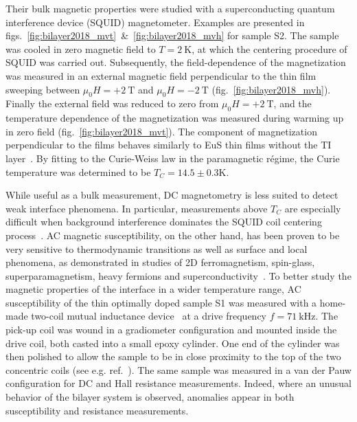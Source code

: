 %
%
%
Their bulk magnetic properties were studied with a superconducting quantum interference device (SQUID) magnetometer. Examples are presented in figs.~\ref{fig:bilayer2018_mvt}~\&~\ref{fig:bilayer2018_mvh} for sample S2. The sample was cooled in zero magnetic field to $T=2~\mathrm{K}$, at which the centering procedure of SQUID was carried out. Subsequently, the field-dependence of the magnetization was measured in an external magnetic field perpendicular to the thin film sweeping between $\mu_0H = +2~\mathrm{T}$ and $\mu_0H = -2~\mathrm{T}$ (fig.~\ref{fig:bilayer2018_mvh}). Finally the external field was reduced to zero from $\mu_0H = +2~\mathrm{T}$, and the temperature dependence of the magnetization was measured during warming up in zero field (fig.~\ref{fig:bilayer2018_mvt}). The component of magnetization perpendicular to the films behaves similarly to EuS thin films without the TI layer~\cite{EuS_PLD}. By fitting to the Curie-Weiss law in the paramagnetic r\'egime, the Curie temperature was determined to be $T_C = 14.5\pm0.3\mathrm{K}$.

While useful as a bulk measurement, DC magnetometry is less suited to detect weak interface phenomena. In particular, measurements above $T_C$ are especially difficult when background interference dominates the SQUID coil centering process~\cite{squid_center_error}. AC magnetic susceptibility, on the other hand, has been proven to be very sensitive to thermodynamic transitions as well as surface and local phenomena, as demonstrated in studies of 2D ferromagnetism, spin-glass, superparamagnetism, heavy fermions and superconductivity~\cite{ac_nitroxide, ac_spin_glass, ac_superpara, Ando1994, Gegenwart2005, Schemm2014}. To better study the magnetic properties of the interface in a wider temperature range, AC susceptibility of the thin optimally doped sample S1 was measured with a home-made two-coil mutual inductance device~\cite{Jeanneret1989,Yazdani1993} at a drive frequency $f=71~\mathrm{kHz}$. The pick-up coil was wound in a gradiometer configuration and mounted inside the drive coil, both casted into a small epoxy cylinder. One end of the cylinder was then polished to allow the sample to be in close proximity to the top of the two concentric coils (see e.g. ref.~\cite{YazdaniThesis}). The same sample was measured in a van der Pauw configuration for DC and Hall resistance measurements. Indeed, where an unusual behavior of the bilayer system is observed, anomalies appear in both susceptibility and resistance measurements.

